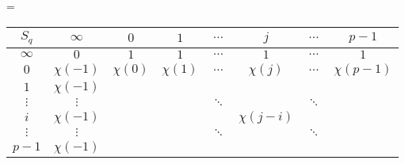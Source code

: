 \documentclass[10pt]{article}
\begin{document}
%
\textwidth=500pt\relax
\hsize=\textwidth\relax
\parindent=0pt\relax
\renewcommand{\arraystretch}{1.2}
%
\begin{preview}%
%
%
%
%
\begin{tabular}{c|ccccccc}
\toprule
 $S_q$ &
$\infty$ & $0$ & $1$ & $\dots$ & $j$ & $\dots$ & $p-1$
\\
\midrule
$\infty$ &
$0$  & $1$  & $1$ & $\dots$ & $1$ & $\dots$ & $1$
\\ 
$0$ &
$\chi(-1)$ & $\chi(0)$ & $\chi(1)$ & $\dots$ & $\chi(j)$ & $\dots$ & $\chi(p-1)$
\\
$1$
& $\chi(-1)$
\\
$\vdots$ & $\vdots$ &&& $\ddots$ && $\ddots$
\\
$i$ & $\chi(-1)$ &&&& $\chi(j-i)$ \\
$\vdots$ & $\vdots$ &&& $\ddots$ && $\ddots$ \\
$p-1$ & $\chi(-1)$ \\
\bottomrule
\end{tabular}%
%
%
%
%
\end{preview}%
\end{document}
